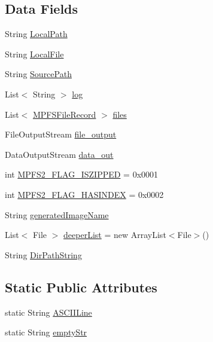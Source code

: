 \subsection*{Data Fields}
\begin{DoxyCompactItemize}
\item 
String \hyperlink{class_microchip_m_p_f_s_1_1_m_p_f_s2_lib_aa396fc601d5eda5056c98ece9d06b262}{Local\+Path}
\item 
String \hyperlink{class_microchip_m_p_f_s_1_1_m_p_f_s2_lib_a26bf3056ff1696480b7019462a2b408d}{Local\+File}
\item 
String \hyperlink{class_microchip_m_p_f_s_1_1_m_p_f_s2_lib_a9286b4d01d45bd2faf1b312da170fdfc}{Source\+Path}
\item 
List$<$ String $>$ \hyperlink{class_microchip_m_p_f_s_1_1_m_p_f_s2_lib_a295bf7f0c9391961619252654d092898}{log}
\item 
List$<$ \hyperlink{class_microchip_m_p_f_s_1_1_m_p_f_s_file_record}{M\+P\+F\+S\+File\+Record} $>$ \hyperlink{class_microchip_m_p_f_s_1_1_m_p_f_s2_lib_a7bf6578967afbe6305c4301b7161822d}{files}
\item 
File\+Output\+Stream \hyperlink{class_microchip_m_p_f_s_1_1_m_p_f_s2_lib_ab03cefa914341b065e79a003ebc36ba5}{file\+\_\+output}
\item 
Data\+Output\+Stream \hyperlink{class_microchip_m_p_f_s_1_1_m_p_f_s2_lib_aa84dd7c55e2064a5c35cd88bc52176e3}{data\+\_\+out}
\item 
int \hyperlink{class_microchip_m_p_f_s_1_1_m_p_f_s2_lib_adfa3cd89f0945610db64b6fceafb9254}{M\+P\+F\+S2\+\_\+\+F\+L\+A\+G\+\_\+\+I\+S\+Z\+I\+P\+P\+E\+D} = 0x0001
\item 
int \hyperlink{class_microchip_m_p_f_s_1_1_m_p_f_s2_lib_aeb8d9420f95959fa34c94e3d1f4f9ffa}{M\+P\+F\+S2\+\_\+\+F\+L\+A\+G\+\_\+\+H\+A\+S\+I\+N\+D\+E\+X} = 0x0002
\item 
String \hyperlink{class_microchip_m_p_f_s_1_1_m_p_f_s2_lib_af35e78a632fd4f732c2b79b4d70992a5}{generated\+Image\+Name}
\item 
List$<$ File $>$ \hyperlink{class_microchip_m_p_f_s_1_1_m_p_f_s2_lib_a77e470b272868c79ecb5d848c5f7a9f7}{deeper\+List} = new Array\+List$<$File$>$()
\item 
String \hyperlink{class_microchip_m_p_f_s_1_1_m_p_f_s2_lib_aa78f4209a0a46dda04250dcb02692286}{Dir\+Path\+String}
\end{DoxyCompactItemize}
\subsection*{Static Public Attributes}
\begin{DoxyCompactItemize}
\item 
static String \hyperlink{class_microchip_m_p_f_s_1_1_m_p_f_s2_lib_a6b3ea23ff741604aad0e4652d9cd6517}{A\+S\+C\+I\+I\+Line}
\item 
static String \hyperlink{class_microchip_m_p_f_s_1_1_m_p_f_s2_lib_ab169555029530863a31ddf6e1d159a06}{empty\+Str}
\end{DoxyCompactItemize}
